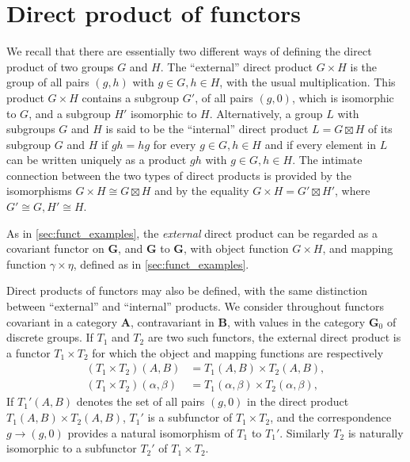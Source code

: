 \documentclass[11pt,a4paper]{report}
\begin{document}
\section{Direct product of functors}\label{sec:funct_prod}
We recall that there are essentially two different ways of defining the direct product of two groups $G$ and $H$. The ``external''
direct product $G\times H$ is the group of all pairs $(g,h)$ with $g\in G, h\in H$, with the usual multiplication. This product
$G\times H$ contains a subgroup $G'$, of all pairs $(g,0)$, which is isomorphic to $G$, and a subgroup $H'$ isomorphic to $H$.
Alternatively, a group $L$ with subgroups $G$ and $H$ is said to be the ``internal'' direct product $L=G\boxtimes H$ of its subgroup
$G$ and $H$ if $gh=hg$ for every $g\in G, h\in H$ and if every element in $L$ can be written uniquely as a product $gh$ with
$g\in G,h\in H$. The intimate connection between the two types of direct products is provided by the isomorphisms $G\times H\cong
G\boxtimes H$ and by the equality $G\times H=G'\boxtimes H'$, where $G'\cong G,H'\cong H$. 

As in \cref{sec:funct_examples}, the \emph{external} direct product can be regarded as a covariant functor on $\mathbf{G}$,
and $\mathbf{G}$ to $\mathbf{G}$, with object function $G\times H$, and mapping function $\gamma\times\eta$, defined as in
\cref{sec:funct_examples}.

Direct products of functors may also be defined, with the same distinction between ``external'' and ``internal'' products. We
consider throughout functors covariant in a category $\mathbf{A}$, contravariant in $\mathbf{B}$, with values in the category
$\mathbf{G}_0$ of discrete groups. If $T_1$ and $T_2$ are two such functors, the external direct product is a functor $T_1\times T_2$
for which the object and mapping functions are respectively
\begin{align}
	(T_1\times T_2)(A,B) &= T_1(A,B)\times T_2(A,B),\label{eq:func_ext1}\\
	(T_1\times T_2)(\alpha,\beta) &= T_1(\alpha,\beta)\times T_2(\alpha,\beta),\label{eq:func_ext2}
\end{align}
If $T_1'(A,B)$  denotes the set of all pairs $(g,0)$ in the direct product $T_1(A,B)\times T_2(A,B)$, $T_1'$ is a subfunctor of
$T_1\times T_2$, and the correspondence $g\rightarrow (g,0)$ provides a natural isomorphism of $T_1$ to $T_1'$. Similarly $T_2$
is naturally isomorphic to a subfunctor $T_2'$ of $T_1\times T_2$.
\end{document}
